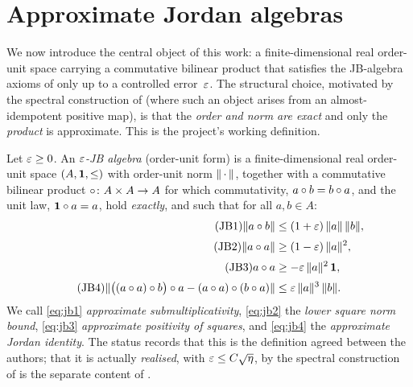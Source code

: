 \section{Approximate Jordan algebras}\label{sec:epsjb}

We now introduce the central object of this work: a finite-dimensional real
order-unit space carrying a commutative bilinear product that satisfies the
JB-algebra axioms of  only up to a controlled error~$\varepsilon$.
The structural choice, motivated by the spectral construction of
 (where such an object arises from an almost-idempotent
positive map), is that the \emph{order and norm are exact} and only the
\emph{product} is approximate. This is the project's working definition.

\begin{definition}\label{def:eps-jb}
\;
Let $\varepsilon\ge 0$. An \emph{$\varepsilon$-JB algebra} (order-unit form) is a
finite-dimensional real order-unit space $(A,\mathbf{1},\le)$ with order-unit norm
$\lVert \,\cdot\, \rVert$, together with a commutative bilinear product
$\circ\colon A\times A\to A$ for which commutativity, $a\circ b=b\circ a$, and the
unit law, $\mathbf{1}\circ a=a$, hold \emph{exactly}, and such that for all $a,b\in A$:
\begin{align}
\label{eq:jb1}
\tag{JB1}
\lVert a\circ b \rVert &\le (1+\varepsilon)\,\lVert a \rVert\,\lVert b \rVert,\\[2pt]
\label{eq:jb2}
\tag{JB2}
\lVert a\circ a \rVert &\ge (1-\varepsilon)\,\lVert a \rVert^2,\\[2pt]
\label{eq:jb3}
\tag{JB3}
a\circ a &\ge -\varepsilon\,\lVert a \rVert^2\,\mathbf{1},\\[2pt]
\label{eq:jb4}
\tag{JB4}
\lVert \bigl((a\circ a)\circ b\bigr)\circ a-(a\circ a)\circ(b\circ a) \rVert
&\le \varepsilon\,\lVert a \rVert^3\,\lVert b \rVert.
\end{align}
We call \eqref{eq:jb1} \emph{approximate submultiplicativity},
\eqref{eq:jb2} the \emph{lower square norm bound},
\eqref{eq:jb3} \emph{approximate positivity of squares},
and \eqref{eq:jb4} the \emph{approximate Jordan identity}.
The status  records that this is the definition agreed
between the authors; that it is actually \emph{realised}, with
$\varepsilon\le C\sqrt{\eta}$, by the spectral construction of  is
the separate  content of .
\end{definition}

